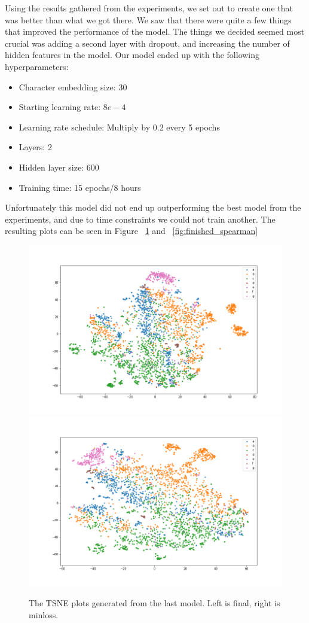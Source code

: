 Using the results gathered from the experiments, we set out to create one that was better than what we got there. We saw that there were quite a few things that improved the performance of the model. The things we decided seemed most crucial was adding a second layer with dropout, and increasing the number of hidden features in the model. Our model ended up with the following hyperparameters:
\begin{itemize}
	\item Character embedding size: 30
	\item Starting learning rate: $8e-4$
	\item Learning rate schedule: Multiply by $0.2$ every 5 epochs
	\item Layers: 2
	\item Hidden layer size: $600$
	\item Training time: 15 epochs/8 hours
\end{itemize}
Unfortunately this model did not end up outperforming the best model from the experiments, and due to time constraints we could not train another. The resulting plots can be seen in Figure ~\ref{fig:finished_tsne} and ~\ref{fig:finished_spearman}

\begin{figure}[!ht]
  \centering
  \includegraphics[width=0.49\linewidth]{latex/imgs/finished_tsne_final.png}
  \includegraphics[width=0.49\linewidth]{latex/imgs/finished_tsne_minloss.png}
  \caption{The TSNE plots generated from the last model. Left is final, right is minloss.}
  \label{fig:finished_tsne}
\end{figure}

